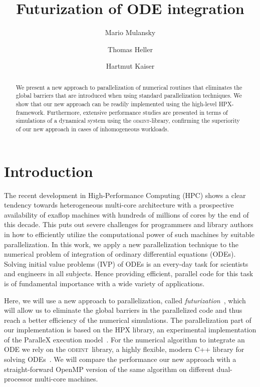 \documentclass[10pt]{elsarticle}
\title{Futurization of ODE integration}
\author[cct]{Mario Mulansky}
\author[fau]{Thomas Heller}
\author[cct]{Hartmut Kaiser}
\newcommand{\odeint}{\textsc{odeint}}
\begin{document}
\begin{abstract}
We present a new approach to parallelization of numerical routines that eliminates the global barriers that are introduced when using standard parallelization techniques.
We show that our new approach can be readily implemented using the high-level HPX-framework.
Furthermore, extensive performance studies are presented in terms of simulations of a dynamical system using the \odeint-library, confirming the superiority of our new approach in cases of inhomogeneous workloads.
\end{abstract}

\maketitle

\section{Introduction}

The recent development in High-Performance Computing (HPC) shows a clear tendency towards heterogeneous multi-core architecture with a prospective availability of exaflop machines with hundreds of millions of cores by the end of this decade.
This puts out severe challenges for programmers and library authors in how to efficiently utilize the computational power of such machines by suitable parallelization.
In this work, we apply a new parallelization technique to the numerical problem of integration of ordinary differential equations (ODEs).
Solving initial value problems (IVP) of ODEs is an every-day task for scientists and engineers in all subjects.
Hence providing efficient, parallel code for this task is of fundamental importance  with a wide variety of applications.

Here, we will use a new approach to parallelization, called \emph{futurization}~\cite{Heller_Kaiser_Mulansky_tbp}, which will allow us to eliminate the global barriers in the parallelized code and thus reach a better efficiency of the numerical simulations.
The parallelization part of our implementation is based on the HPX library, an experimental implementation of the ParalleX execution model~\cite{Kaiser_Brodowicz_Sterling_09}.
For the numerical algorithm to integrate an ODE we rely on the \odeint\ library, a highly flexible, modern C++ library for solving ODEs~\cite{Ahnert_Mulansky_11}.
We will compare the performance our new approach with a straight-forward OpenMP version of the same algorithm on different dual-processor multi-core machines.
\end{document}
